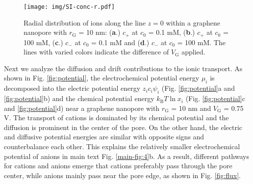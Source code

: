 \documentclass[manuscript=suppinfo,email=true, hyperref=true, keywords=false]{achemso}
\newcommand{\Fig}{Fig.}
\begin{document}
\begin{figure}[htbp]
  \centering
  \texttt{[image: img/SI-conc-r.pdf]}
  \caption{Radial distribution of ions along the line $z=0$ within a
    graphene nanopore with $r_{\mathrm{G}}$ = 10 nm: (\textbf{a}.)
    $c_{+}$ at $c_{0}$ = 0.1 mM, (\textbf{b}.) $c_{+}$ at $c_{0}$ =
    100 mM, (\textbf{c}.) $c_{-}$ at $c_{0}$ = 0.1 mM and
    (\textbf{d}.) $c_{-}$ at $c_{0}$ = 100 mM. The lines with varied
    colors indicate the difference of $V_{\mathrm{G}}$ applied.}
  \label{fig:conc-r}
\end{figure}

Next we analyze the diffusion and drift contributions to the ionic
transport. As shown in \Fig{} \ref{fig:potential}, the
electrochemical potential energy $\mu_{i}$ is decomposed into the
electric potential energy $z_{i} c_{i} \psi_{i}$ (\Fig{}
\ref{fig:potential}a and \ref{fig:potential}b) and the chemical
potential energy $k_{\mathrm{B}}T \ln x_{i}$ (\Fig{}
\ref{fig:potential}c and \ref{fig:potential}d) near a graphene
nanopore with $r_{\mathrm{G}}$ = 10 nm and $V_{\mathrm{G}}$ = 0.75
V. The transport of cations is dominated by its chemical potential and
the diffusion is prominent in the center of the pore. On the other
hand, the electric and diffusive potential energies are similar with
opposite signs and counterbalance each other. This explains the
relatively smaller electrochemical potential of anions in main text
\Fig{} \ref{main-fig:4}b. As a result, different pathways for cations
and anions emerge that cations preferably pass through the pore
center, while anions mainly pass near the pore edge, as shown in
\Fig{} \ref{fig:flux}.
\end{document}
